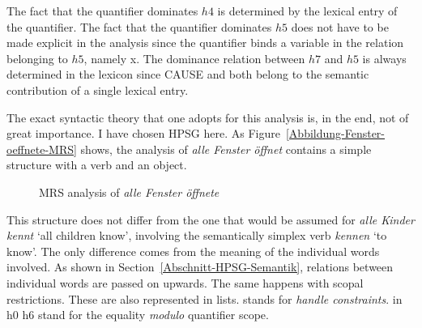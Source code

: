 The fact that the quantifier dominates $h4$ is determined by the lexical entry of the quantifier. The fact that
the quantifier dominates $h5$ does not have to be made explicit in the analysis since the quantifier binds a variable
in the relation belonging to $h5$, namely x. The dominance relation between $h7$ and $h5$ is always determined in the lexicon
since CAUSE and   both belong to the semantic contribution of a single lexical entry.

The exact syntactic theory that one adopts for this analysis is, in the end, not of great importance.
I have chosen HPSG here. As Figure~\vref{Abbildung-Fenster-oeffnete-MRS} shows, the analysis of \emph{alle Fenster öffnet}
contains a simple structure with a verb and an object.
\begin{figure}
\caption{\label{Abbildung-Fenster-oeffnete-MRS}MRS analysis of \emph{alle Fenster öffnete}}
\end{figure}%
This structure does not differ from the one that would be assumed for \emph{alle Kinder kennt} `all
children know', involving the semantically simplex verb \emph{kennen} `to know'.
The only difference comes from the meaning of the individual words involved.
As shown in Section~\ref{Abschnitt-HPSG-Semantik}, relations between individual words are passed on upwards.
The same happens with scopal restrictions. These are also represented in lists. \hcons stands for \emph{handle constraints}.
\qeq in h0 \qeq h6 stand for the equality \emph{modulo} quantifier scope.

